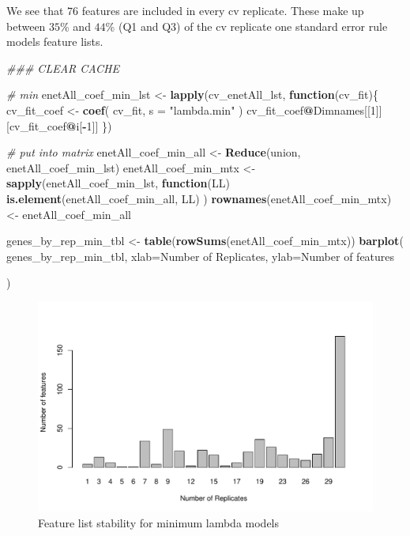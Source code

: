 \documentclass[
]{book}
\newenvironment{Shaded}{\begin{snugshade}}{\end{snugshade}}
\newcommand{\CommentTok}[1]{\textcolor[rgb]{0.56,0.35,0.01}{\textit{#1}}}
\newcommand{\ControlFlowTok}[1]{\textcolor[rgb]{0.13,0.29,0.53}{\textbf{#1}}}
\newcommand{\DataTypeTok}[1]{\textcolor[rgb]{0.13,0.29,0.53}{#1}}
\newcommand{\DecValTok}[1]{\textcolor[rgb]{0.00,0.00,0.81}{#1}}
\newcommand{\KeywordTok}[1]{\textcolor[rgb]{0.13,0.29,0.53}{\textbf{#1}}}
\newcommand{\NormalTok}[1]{#1}
\newcommand{\OperatorTok}[1]{\textcolor[rgb]{0.81,0.36,0.00}{\textbf{#1}}}
\newcommand{\StringTok}[1]{\textcolor[rgb]{0.31,0.60,0.02}{#1}}
\begin{document}
We see that \(76\) features are included in every
cv replicate. These make up between
\(35\)\%
and
\(44\)\%
(Q1 and Q3) of the cv replicate one standard error rule models feature lists.

\begin{Shaded}
\begin{Highlighting}[]
\CommentTok{\#\#\# CLEAR CACHE}


\CommentTok{\# min}
\NormalTok{enetAll\_coef\_min\_lst <{-}}\StringTok{ }\KeywordTok{lapply}\NormalTok{(cv\_enetAll\_lst, }\ControlFlowTok{function}\NormalTok{(cv\_fit)\{}
\NormalTok{ cv\_fit\_coef <{-}}\StringTok{ }\KeywordTok{coef}\NormalTok{(}
\NormalTok{ cv\_fit,}
 \DataTypeTok{s =} \StringTok{"lambda.min"}
\NormalTok{ )}
\NormalTok{ cv\_fit\_coef}\OperatorTok{@}\NormalTok{Dimnames[[}\DecValTok{1}\NormalTok{]][cv\_fit\_coef}\OperatorTok{@}\NormalTok{i[}\OperatorTok{{-}}\DecValTok{1}\NormalTok{]]}
\NormalTok{ \})}

\CommentTok{\# put into matrix}
\NormalTok{enetAll\_coef\_min\_all <{-}}\StringTok{ }\KeywordTok{Reduce}\NormalTok{(union, enetAll\_coef\_min\_lst)}
\NormalTok{enetAll\_coef\_min\_mtx <{-}}\StringTok{ }\KeywordTok{sapply}\NormalTok{(enetAll\_coef\_min\_lst, }
  \ControlFlowTok{function}\NormalTok{(LL) }\KeywordTok{is.element}\NormalTok{(enetAll\_coef\_min\_all, LL)}
\NormalTok{)}
\KeywordTok{rownames}\NormalTok{(enetAll\_coef\_min\_mtx) <{-}}\StringTok{ }\NormalTok{enetAll\_coef\_min\_all}

\NormalTok{genes\_by\_rep\_min\_tbl <{-}}\StringTok{ }\KeywordTok{table}\NormalTok{(}\KeywordTok{rowSums}\NormalTok{(enetAll\_coef\_min\_mtx))}
\KeywordTok{barplot}\NormalTok{(}
\NormalTok{ genes\_by\_rep\_min\_tbl,}
 \DataTypeTok{xlab=}\StringTok{\textquotesingle{}Number of Replicates\textquotesingle{}}\NormalTok{,}
 \DataTypeTok{ylab=}\StringTok{\textquotesingle{}Number of features\textquotesingle{}}

\NormalTok{)}
\end{Highlighting}
\end{Shaded}

\begin{figure}
\centering
\includegraphics{Static/figures/enet-feature-list-min-1.pdf}
\caption{\label{fig:enet-feature-list-min}Feature list stability for minimum lambda models}
\end{figure}
\end{document}
